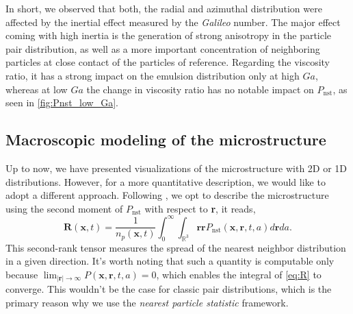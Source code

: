 In short, we observed that both, the radial and azimuthal distribution were affected by the inertial effect measured by the \textit{Galileo} number. 
The major effect coming with high inertia is the generation of strong anisotropy in the particle pair distribution, as well as a more important concentration of neighboring particles at close contact of the particles of reference. 
Regarding the viscosity ratio, it has a strong impact on the emulsion distribution  only at high $Ga$, whereas at low $Ga$ the change in viscosity ratio has no notable impact on $P_\text{nst}$, as seen in \ref{fig:Pnst_low_Ga}. 


\subsection{Macroscopic modeling of the microstructure}
Up to now, we have presented visualizations of the microstructure with 2D or 1D distributions. 
However, for a more quantitative description, we would like to adopt a different approach. 
Following \citet{zhang2023evolution}, we opt to describe the microstructure using the second moment of $P_\text{nst}$ with respect to \textbf{r}, it reads,
\begin{equation}
    \textbf{R}(\textbf{x},t) =\frac{1}{n_p(\textbf{x},t)} 
    \int_0^\infty 
    \int_{\mathbb{R}^3} \textbf{rr} P_\text{nst}(\textbf{x},\textbf{r},t,a) d\textbf{r} da.
    \label{eq:R}
\end{equation}
This second-rank tensor measures the spread of the nearest neighbor distribution in a given direction. 
It's worth noting that such a quantity is computable only because $\lim_{|\textbf{r}|\to \infty} P(\textbf{x},\textbf{r},t,a) = 0$, which enables the integral of \ref{eq:R} to converge. 
This wouldn't be the case for classic pair distributions, which is the primary reason why we use the \textit{nearest particle statistic} framework. 

